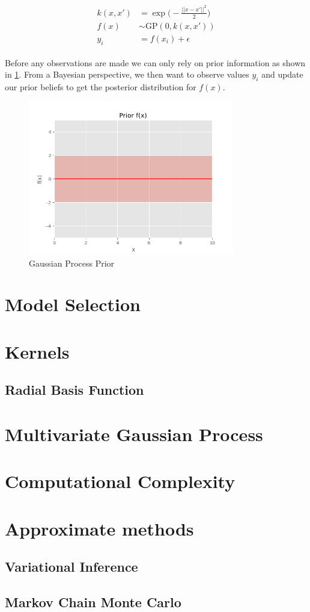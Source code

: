 \begin{align}\label{eq:theory_simple_gp}
    \begin{split}
    k(x, x') &= \exp\bigg(-\frac{|| x - x'||^2}{2}\bigg)\\
    f(x) &\sim \text{GP}(0, k(x, x'))\\
    y_i &= f(x_i) + \epsilon
    \end{split}
\end{align}

Before any observations are made we can only rely on prior information as shown in \cref{fig:gp_prior}. From a Bayesian perspective, we then want to observe values $y_i$ and update our prior beliefs to get the posterior distribution for $f(x)$.

\begin{figure}[h]
    \centering
    \includegraphics[width=0.8\textwidth]{figures/introduction-gp/prior.png}
    \caption{Gaussian Process Prior}
    \label{fig:gp_prior}
\end{figure}

\section{Model Selection}
\section{Kernels}\label{sec:kernels}

\subsection{Radial Basis Function}\label{sec:kernels_rbf}
\section{Multivariate Gaussian Process}
\section{Computational Complexity}
\section{Approximate methods}
\subsection{Variational Inference}
\subsection{Markov Chain Monte Carlo}
